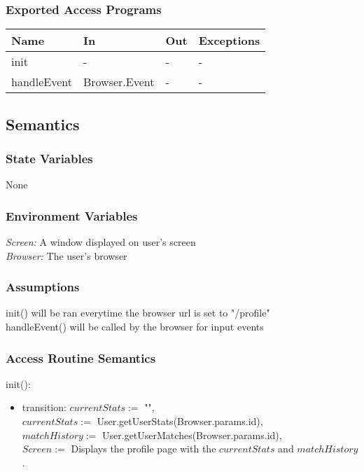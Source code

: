 \documentclass[12pt, titlepage]{article}
\begin{document}
\subsubsection{Exported Access Programs}
\begin{center}
\begin{tabular}{p{2cm} p{4cm} p{4cm} p{2cm}}
\hline
\textbf{Name} & \textbf{In} & \textbf{Out} & \textbf{Exceptions} \\
\hline
init & - & - & - \\
handleEvent & Browser.Event & - & -\\
\hline
\end{tabular}
\end{center}
\subsection{Semantics}
\subsubsection{State Variables}
None
\subsubsection{Environment Variables}
\textit{Screen: } A window displayed on user's screen\\
\textit{Browser: } The user's browser

\subsubsection{Assumptions}

init() will be ran everytime the browser url is set to "/profile"\\
handleEvent() will be called by the browser for input events

\subsubsection{Access Routine Semantics}
\noindent init():
\begin{itemize}
\item transition: $currentStats :=$ "",\\
$currentStats :=$ User.getUserStats(Browser.params.id),\\
$matchHistory :=$ User.getUserMatches(Browser.params.id),\\
$Screen :=$ Displays the profile page with the $currentStats$ and $matchHistory$. 
\end{itemize}
\end{document}
